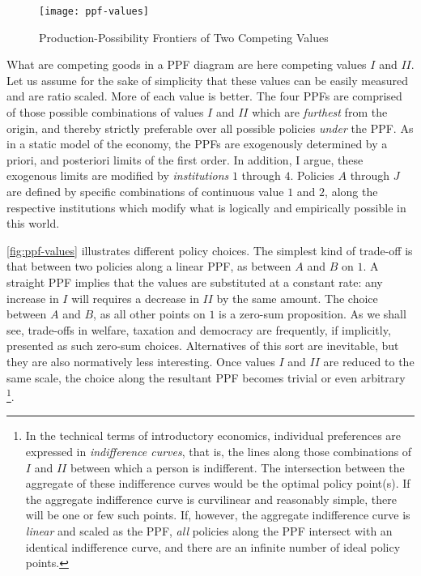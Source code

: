 \begin{figure}[htbp]
	\centering
	\texttt{[image: ppf-values]}  
	\caption{Production-Possibility Frontiers of Two Competing Values}
	\label{fig:ppf-values}
\end{figure}%

	What are competing goods in a \gls{PPF} diagram are here competing values $I$ and $II$. 
	Let us assume for the sake of simplicity that these values can be easily measured and are ratio scaled.
	More of each value is better.
	The four \glspl{PPF} are comprised of those possible combinations of values $I$ and $II$ which are \emph{furthest} from the origin, and thereby strictly preferable over all possible policies \emph{under} the \gls{PPF}.
	As in a static model of the economy, the \glspl{PPF} are exogenously determined by a priori, and posteriori limits of the first order.
	In addition, I argue, these exogenous limits are modified by \emph{institutions} $1$ through $4$.
	 Policies $A$ through $J$ are defined by specific combinations of continuous value $1$ and $2$, along the respective institutions which modify what is logically and empirically possible in this world.
	
	\autoref{fig:ppf-values} illustrates different policy choices.
	The simplest kind of trade-off is that between two policies along a linear \gls{PPF}, as between $A$ and $B$ on $1$.
	A straight \gls{PPF} implies that the values are substituted at a constant rate: any increase in $I$ will requires a decrease in $II$ by the same amount.
	The choice between $A$ and $B$, as all other points on $1$ is a zero-sum proposition.
	As we shall see, trade-offs in welfare, taxation and democracy are frequently, if implicitly, presented as such zero-sum choices.
	Alternatives of this sort are inevitable, but they are also normatively less interesting.
	Once values $I$ and $II$ are reduced to the same scale, the choice along the resultant \gls{PPF} becomes trivial or even arbitrary
	\footnote{
		In the technical terms of introductory economics, individual preferences are expressed in \emph{indifference curves}, that is, the lines along those combinations of $I$ and $II$ between which a person is indifferent.
		The intersection between the aggregate of these indifference curves would be the optimal policy point(s). %
		If the aggregate indifference curve is curvilinear and reasonably simple, there will be one or few such points.
		If, however, the aggregate indifference curve is \emph{linear} and scaled as the \gls{PPF}, \emph{all} policies along the \gls{PPF} intersect with an identical indifference curve, and there are an infinite number of ideal policy points.
	}.%
	
